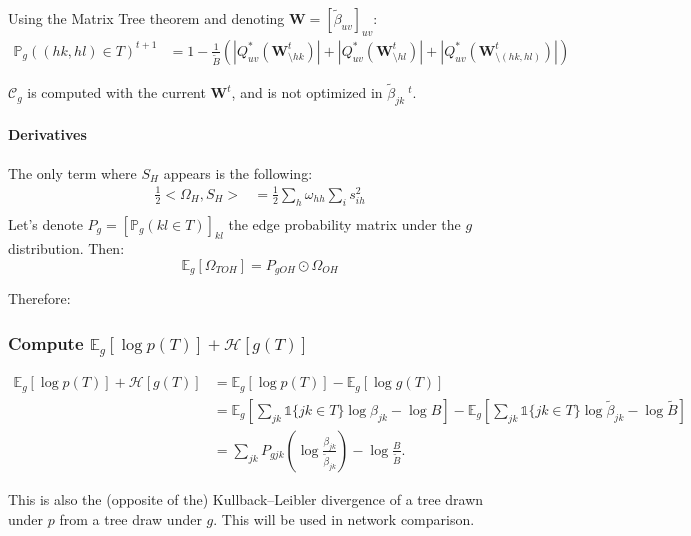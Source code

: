 \documentclass[11pt,a4paper]{article}
\newcommand*\widefbox[1]{\fbox{\hspace{3em}#1\hspace{3em}}}
\newcommand{\Esp}{\mathds{E}}
\newcommand{\entr}{\mathcal{H}}
\begin{document}
Using the Matrix Tree theorem and denoting $\bm{W} = [\widetilde{\beta}_{uv}]_{uv}$:
\begin{align*}
\mathds{P}_g((hk,hl)\in T)^{t+1}&= 1-\frac{1}{\widetilde{B}} \left(  |Q_{uv}^*(\bm{W}_{\setminus hk}^t)|+|Q_{uv}^*(\bm{W}_{\setminus hl}^t)|+|Q_{uv}^*(\bm{W}_{\setminus (hk,hl)}^t)| \right) 
\end{align*}

$\mathcal{C}_g$ is computed with the current $\bm{W}^t$, and is not optimized in $\widetilde{\beta}_{jk}\:^t$.
\paragraph{Derivatives\\}
The only term where $S_H$ appears is the following:
\begin{align*}
\frac{1}{2}<\Omega_H, S_H> &= \frac{1}{2} \sum_h \omega_{hh}\sum_i s_{ih}^2\\
\end{align*}
Let's denote $P_g = [\mathds{P}_g(kl \in T)]_{kl}$ the edge probability matrix under the $g$ distribution. Then:
$$\Esp_g[\Omega_{TOH}] = P_{gOH} \odot \Omega_{OH}$$

Therefore:

\subsubsection{Compute $\Esp_g[\log p(T)] + \entr[g(T)]$}

\begin{align*}
\Esp_g[\log p(T)] + \entr[g(T)]&=\Esp_g[\log p(T)] -\Esp_g[\log g(T)]\\
&=\Esp_g - \Esp_g\\
&= \sum_{jk}P_{gjk} \left(\log {}\right) - \log {} 
.\end{align*}

This is also the (opposite of the) Kullback–Leibler divergence of a tree drawn under $p$ from a tree draw under $g$. This will be used in network comparison.
\end{document}
